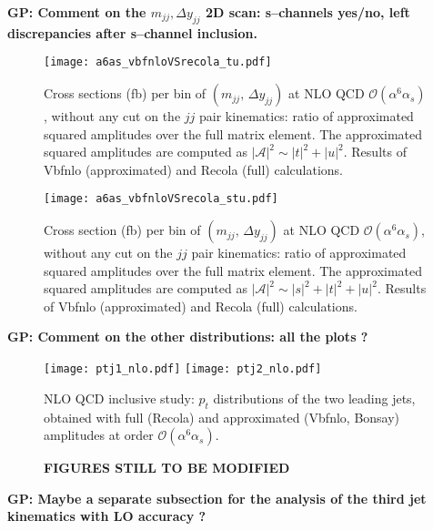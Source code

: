 {\bf GP: Comment on the $m_{jj}, \Delta y_{jj}$ 2D scan: s--channels yes/no, left discrepancies after s--channel inclusion.}
\begin{figure}[h]
\centering
{\texttt{[image: a6as\_vbfnloVSrecola\_tu.pdf]}} 
\caption{Cross sections (fb) per bin of $(m_{jj},\,\Delta y_{jj})$ at NLO QCD $\mathcal{O}(\alpha^6\alpha_s)$, without any cut on the $jj$ pair kinematics: ratio of approximated squared amplitudes over the full matrix element. The approximated squared amplitudes are computed as $|\mathcal{A}|^2 \sim |t|^2 + |u|^2$. Results of {\sc Vbfnlo} (approximated) and {\sc Recola} (full) calculations.}\label{fig:ratio2d_NLO}
\end{figure}

\begin{figure}[hbt]
\centering
{\texttt{[image: a6as\_vbfnloVSrecola\_stu.pdf]}}
\caption{Cross section (fb) per bin of $(m_{jj},\,\Delta y_{jj})$ at NLO QCD $\mathcal{O}(\alpha^6\alpha_s)$, without any cut on the $jj$ pair kinematics:  ratio of approximated squared amplitudes over the full matrix element. The approximated squared amplitudes are computed as $|\mathcal{A}|^2 \sim |s|^2 + |t|^2 + |u|^2$. Results of {\sc Vbfnlo} (approximated) and {\sc Recola} (full) calculations.}\label{fig:mjjdyjj_2d_NLO}
\end{figure}

{\bf GP: Comment on the other distributions: all the plots ?}
\begin{figure}[hbt]
\centering
{\texttt{[image: ptj1\_nlo.pdf]}}
{\texttt{[image: ptj2\_nlo.pdf]}}
\caption{NLO QCD inclusive study: $p_t$ distributions of the two leading jets, obtained with full ({\sc Recola}) and approximated ({\sc Vbfnlo, Bonsay}) amplitudes at order $\mathcal{O}(\alpha^6\alpha_s)$.} \label{fig:mjjdyjj_1d_2}
\end{figure}

\begin{figure}[hbt]
\centering
{}
\caption{{\bf FIGURES STILL TO BE MODIFIED} } \label{fig:mjjdyjj_1d_3}
\end{figure}

{\bf GP: Maybe a separate subsection for the analysis of the third jet kinematics with LO accuracy ?}
